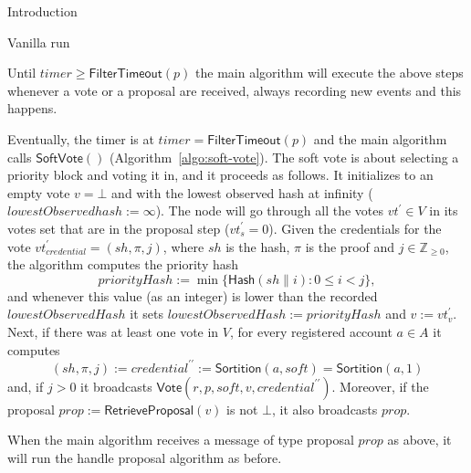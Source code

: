 \documentclass[10pt,a4paper]{article}
\begin{document}
\begin{section}{Introduction}
\begin{subsection}{Vanilla run}

Until $timer\ge \mathsf{FilterTimeout}(p)$ the main algorithm will execute the above steps
whenever a vote or a proposal are received, always recording new events and this happens.

Eventually, the timer is at $timer=\mathsf{FilterTimeout}(p)$ and the main algorithm calls 
$\mathsf{SoftVote()}$ (Algorithm~\ref{algo:soft-vote}).
The soft vote is about selecting a priority block and voting it in, and it proceeds as follows.
It initializes to an empty vote $v=\bot$ and with the lowest observed hash at infinity ($lowestObservedhash:=\infty$).
The node will go through all the votes $vt^\prime\in V$ in its votes set that are in the
proposal step ($vt^\prime_s=0$).
Given the credentials for the vote $vt^\prime_{credential}=(sh,\pi, j)$, where $sh$ is the hash,
$\pi$ is the proof and $j\in\mathbb{Z}_{\geq 0}$, the algorithm computes the priority hash
$$
priorityHash:=\min\{\mathsf{Hash}(sh\| i): 0\le i<j\},
$$
and whenever this value (as an integer) is lower than the recorded 
$lowestObservedHash$ it sets 
$lowestObservedHash:=priorityHash$ and $v:=vt^\prime_v$.
Next, if there was at least one vote in $V$, for every registered account $a\in A$
it computes 
$$
(sh,\pi,j):=credential^{\prime\prime}:=\mathsf{Sortition}(a,soft)=\mathsf{Sortition}(a,1)
$$
and, if $j>0$ it broadcasts $\mathsf{Vote}(r,p,soft,v,credential^{\prime\prime})$.
Moreover, if the proposal $prop:=\mathsf{RetrieveProposal}(v)$ is not $\bot$, it also broadcasts $prop$.

When the main algorithm receives a message of type proposal 
$prop$ as above, it will
run the handle proposal algorithm as before.


\end{subsection}
\end{section}
\end{document}
